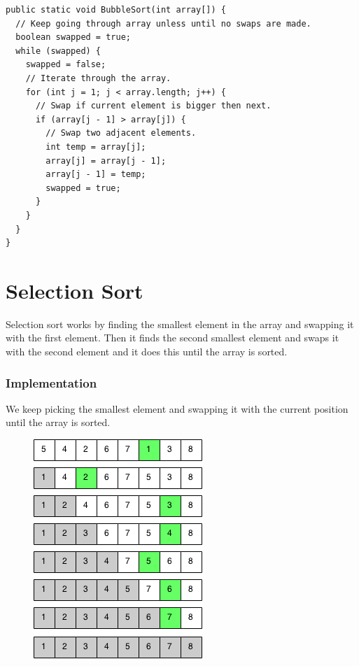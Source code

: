\documentclass[11pt,oneside]{book}
\makeatletter
\def\maxwidth#1{\ifdim\Gin@nat@width>#1 #1\else\Gin@nat@width\fi}
\makeatother
\begin{document}
\begin{lstlisting}
public static void BubbleSort(int array[]) {
  // Keep going through array unless until no swaps are made.
  boolean swapped = true;
  while (swapped) {
    swapped = false;
    // Iterate through the array.
    for (int j = 1; j < array.length; j++) {
      // Swap if current element is bigger then next.
      if (array[j - 1] > array[j]) {
        // Swap two adjacent elements.
        int temp = array[j];
        array[j] = array[j - 1];
        array[j - 1] = temp;
        swapped = true;
      }
    }
  }
}
\end{lstlisting}

        \section{ Selection Sort }
        

Selection sort works by finding the smallest element in the array and swapping it with the first element. Then it finds the second smallest element and swaps it with the second element and it does this until the array is sorted.

\subsubsection{Implementation}

We keep picking the smallest element and swapping it with the current position until the array is sorted.

\vspace{5px}\begin{figure}[H]\centering
        \includegraphics[width=0.66\maxwidth{\textwidth}]{selection_sort.png}
        \end{figure}
\end{document}

